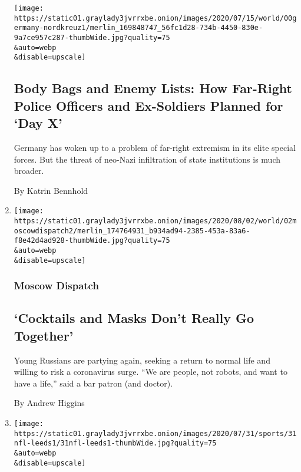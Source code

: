 \begin{enumerate}
  \texttt{[image: https://static01.graylady3jvrrxbe.onion/images/2020/07/15/world/00germany-nordkreuz1/merlin\_169848747\_56fc1d28-734b-4450-830e-9a7ce957c287-thumbWide.jpg?quality=75\\\&auto=webp\\\&disable=upscale]}

  \hypertarget{body-bags-and-enemy-lists-how-far-right-police-officers-and-ex-soldiers-planned-for-day-x}{%
  \subsection{Body Bags and Enemy Lists: How Far-Right Police Officers
  and Ex-Soldiers Planned for `Day
  X'}\label{body-bags-and-enemy-lists-how-far-right-police-officers-and-ex-soldiers-planned-for-day-x}}

  Germany has woken up to a problem of far-right extremism in its elite
  special forces. But the threat of neo-Nazi infiltration of state
  institutions is much broader.

  By Katrin Bennhold
\item
  \href{/2020/08/01/world/europe/russia-moscow-coronaviru.html}{}

  \texttt{[image: https://static01.graylady3jvrrxbe.onion/images/2020/08/02/world/02moscowdispatch2/merlin\_174764931\_b934ad94-2385-453a-83a6-f8e42d4ad928-thumbWide.jpg?quality=75\\\&auto=webp\\\&disable=upscale]}

  \hypertarget{moscow-dispatch}{%
  \subsubsection{Moscow Dispatch}\label{moscow-dispatch}}

  \hypertarget{cocktails-and-masks-dont-really-go-together}{%
  \subsection{`Cocktails and Masks Don't Really Go
  Together'}\label{cocktails-and-masks-dont-really-go-together}}

  Young Russians are partying again, seeking a return to normal life and
  willing to risk a coronavirus surge. ``We are people, not robots, and
  want to have a life,'' said a bar patron (and doctor).

  By Andrew Higgins
\item
  \href{/2020/07/31/sports/soccer/leeds-united-san-francisco-49ers.html}{}

  \texttt{[image: https://static01.graylady3jvrrxbe.onion/images/2020/07/31/sports/31nfl-leeds1/31nfl-leeds1-thumbWide.jpg?quality=75\\\&auto=webp\\\&disable=upscale]}


\end{enumerate}
